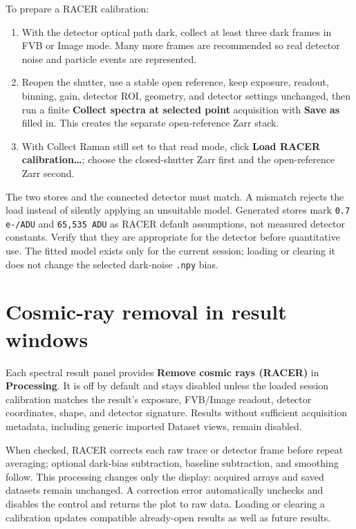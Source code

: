\documentclass[11pt,oneside]{report}
\newcommand{\ui}[1]{\textbf{#1}}
\newcommand{\code}[1]{\texttt{#1}}
\begin{document}
To prepare a RACER calibration:
\begin{enumerate}
  \item With the detector optical path dark, collect at least three dark frames in
        FVB or Image mode. Many more frames are recommended so real detector noise
        and particle events are represented.
  \item Reopen the shutter, use a stable open reference, keep exposure, readout,
        binning, gain, detector ROI, geometry, and detector settings unchanged,
        then run a finite \ui{Collect spectra at selected point} acquisition with
        \ui{Save as} filled in. This creates the separate open-reference Zarr stack.
  \item With Collect Raman still set to that read mode, click
        \ui{Load RACER calibration\ldots}; choose the closed-shutter Zarr first and
        the open-reference Zarr second.
\end{enumerate}
The two stores and the connected detector must match. A mismatch rejects the load
instead of silently applying an unsuitable model. Generated stores mark
\code{0.7 e-/ADU} and \code{65,535 ADU} as RACER default assumptions, not measured
detector constants. Verify that they are appropriate for the detector before
quantitative use. The fitted model exists only for the current session; loading or
clearing it does not change the selected dark-noise \code{.npy} bias.

\section*{Cosmic-ray removal in result windows}
Each spectral result panel provides \ui{Remove cosmic rays (RACER)} in
\ui{Processing}. It is off by default and stays disabled unless the loaded session
calibration matches the result's exposure, FVB/Image readout, detector coordinates,
shape, and detector signature. Results without sufficient acquisition metadata,
including generic imported Dataset views, remain disabled.

When checked, RACER corrects each raw trace or detector frame before repeat
averaging; optional dark-bias subtraction, baseline subtraction, and smoothing
follow. This processing changes only the display: acquired arrays and saved datasets
remain unchanged. A correction error automatically unchecks and disables the control
and returns the plot to raw data. Loading or clearing a calibration updates compatible
already-open results as well as future results.
\end{document}
